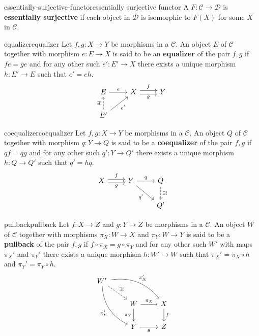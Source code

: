 \begin{topic}{essentially-surjective-functor}{essentially surjective functor}
    A  $F : \mathcal{C} \to \mathcal{D}$ is \textbf{essentially surjective} if each object in $\mathcal{D}$ is isomorphic to $F(X)$ for some $X$ in $\mathcal{C}$.
\end{topic}

\begin{topic}{equalizer}{equalizer}
    Let $f, g : X \to Y$ be morphisms in a  $\mathcal{C}$. An object $E$ of $\mathcal{C}$ together with morphism $e : E \to X$ is said to be an \textbf{equalizer} of the pair $f, g$ if $fe = ge$ and for any other such $e' : E' \to X$ there exists a unique morphism $h : E' \to E$ such that $e' = eh$.
    \[ \begin{tikzcd} E \arrow{r}{e} & X \arrow[shift left=0.25em]{r}{f} \arrow[swap, shift right=0.25em]{r}{g} & Y \\ E' \arrow[dashed]{u}{\exists!} \arrow[swap]{ur}{e'} && \end{tikzcd} \]
\end{topic}

\begin{topic}{coequalizer}{coequalizer}
    Let $f, g : X \to Y$ be morphisms in a  $\mathcal{C}$. An object $Q$ of $\mathcal{C}$ together with morphism $q : Y \to Q$ is said to be a \textbf{coequalizer} of the pair $f, g$ if $qf = qg$ and for any other such $q' : Y \to Q'$ there exists a unique morphism $h : Q \to Q'$ such that $q' = hq$.
    \[ \begin{tikzcd} X \arrow[shift left=0.25em]{r}{f} \arrow[swap, shift right=0.25em]{r}{g} & Y \arrow{r}{q} \arrow[swap]{dr}{q'} & Q \arrow[dashed]{d}{\exists!} \\ && Q' \end{tikzcd} \]
\end{topic}

\begin{topic}{pullback}{pullback}
    Let $f : X \to Z$ and $g : Y \to Z$ be morphisms in a  $\mathcal{C}$. An object $W$ of $\mathcal{C}$ together with morphisms $\pi_X: W \to X$ and $\pi_Y : W \to Y$ is said to be a \textbf{pullback} of the pair $f, g$ if $f \circ \pi_X = g \circ \pi_Y$ and for any other such $W'$ with maps $\pi_X'$ and $\pi_Y'$ there exists a unique morphism $h : W' \to W$ such that $\pi_X' = \pi_X \circ h$ and $\pi_Y' = \pi_Y \circ h$.
    \[ \begin{tikzcd} W' \arrow[bend left=30]{rrd}{\pi_X'} \arrow[swap, bend right=30]{ddr}{\pi_Y'} \arrow[dashed]{rd}{\exists!} & & \\ & W \arrow{r}{\pi_X} \arrow[swap]{d}{\pi_Y} & X \arrow{d}{f} \\ & Y \arrow[swap]{r}{g} & Z \end{tikzcd} \]
\end{topic}

